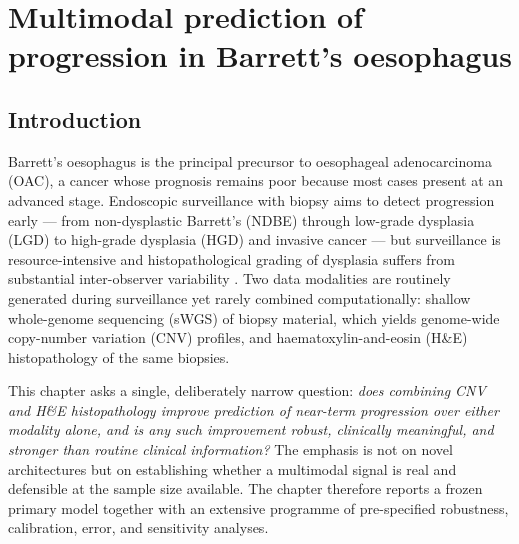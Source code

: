 

\chapter{Multimodal prediction of progression in Barrett's oesophagus}
\label{ch:multimodal-barretts}

\section{Introduction}
\label{sec:intro}

Barrett's oesophagus is the principal precursor to oesophageal adenocarcinoma
(OAC), a cancer whose prognosis remains poor because most cases present at an
advanced stage. Endoscopic surveillance with biopsy aims to detect progression
early --- from non-dysplastic Barrett's (NDBE) through low-grade dysplasia (LGD)
to high-grade dysplasia (HGD) and invasive cancer --- but surveillance is
resource-intensive and histopathological grading of dysplasia suffers from
substantial inter-observer variability \cite{killcoyne2020}. Two data modalities
are routinely generated during surveillance yet rarely combined
computationally: shallow whole-genome sequencing (sWGS) of biopsy material,
which yields genome-wide copy-number variation (CNV) profiles, and
haematoxylin-and-eosin (H\&E) histopathology of the same biopsies.

This chapter asks a single, deliberately narrow question: \emph{does combining
CNV and H\&E histopathology improve prediction of near-term progression over
either modality alone, and is any such improvement robust, clinically
meaningful, and stronger than routine clinical information?} The emphasis is not
on novel architectures but on establishing whether a multimodal signal is real
and defensible at the sample size available. The chapter therefore reports a
frozen primary model together with an extensive programme of pre-specified
robustness, calibration, error, and sensitivity analyses.

